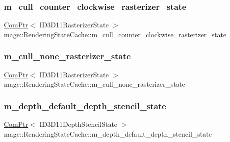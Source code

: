 \subsubsection{\texorpdfstring{m\+\_\+cull\+\_\+counter\+\_\+clockwise\+\_\+rasterizer\+\_\+state}{m\_cull\_counter\_clockwise\_rasterizer\_state}}
{\footnotesize\ttfamily \hyperlink{namespacemage_ae74f374780900893caa5555d1031fd79}{Com\+Ptr}$<$ I\+D3\+D11\+Rasterizer\+State $>$ mage\+::\+Rendering\+State\+Cache\+::m\+\_\+cull\+\_\+counter\+\_\+clockwise\+\_\+rasterizer\+\_\+state\hspace{0.3cm}{\ttfamily [private]}}

\hypertarget{structmage_1_1_rendering_state_cache_a3801dbdf6386c9534123d695cbde47c7}{}\label{structmage_1_1_rendering_state_cache_a3801dbdf6386c9534123d695cbde47c7} 
\subsubsection{\texorpdfstring{m\+\_\+cull\+\_\+none\+\_\+rasterizer\+\_\+state}{m\_cull\_none\_rasterizer\_state}}
{\footnotesize\ttfamily \hyperlink{namespacemage_ae74f374780900893caa5555d1031fd79}{Com\+Ptr}$<$ I\+D3\+D11\+Rasterizer\+State $>$ mage\+::\+Rendering\+State\+Cache\+::m\+\_\+cull\+\_\+none\+\_\+rasterizer\+\_\+state\hspace{0.3cm}{\ttfamily [private]}}

\hypertarget{structmage_1_1_rendering_state_cache_ad7f220ca4bc92d814e3e9044b0edf7e2}{}\label{structmage_1_1_rendering_state_cache_ad7f220ca4bc92d814e3e9044b0edf7e2} 
\subsubsection{\texorpdfstring{m\+\_\+depth\+\_\+default\+\_\+depth\+\_\+stencil\+\_\+state}{m\_depth\_default\_depth\_stencil\_state}}
{\footnotesize\ttfamily \hyperlink{namespacemage_ae74f374780900893caa5555d1031fd79}{Com\+Ptr}$<$ I\+D3\+D11\+Depth\+Stencil\+State $>$ mage\+::\+Rendering\+State\+Cache\+::m\+\_\+depth\+\_\+default\+\_\+depth\+\_\+stencil\+\_\+state\hspace{0.3cm}{\ttfamily [private]}}

